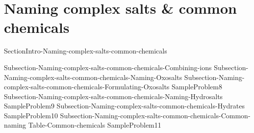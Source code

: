 \documentclass[main.tex]{subfiles}
\newcommand\chapterlabel{Ch-naming}\setcounter{figurenewcounter}{0}\setcounter{tablenewcounter}{0}\setcounter{formulanewcounter}{0}
\begin{document}
\section{Naming complex salts  \& common chemicals}
{SectionIntro-Naming-complex-salts-common-chemicals}
\sloppy \begin{description}
{Subsection-Naming-complex-salts-common-chemicals-Combining-ions}
{Subsection-Naming-complex-salts-common-chemicals-Naming-Oxosalts}
{Subsection-Naming-complex-salts-common-chemicals-Formulating-Oxosalts}
{SampleProblem8}
{Subsection-Naming-complex-salts-common-chemicals-Naming-Hydrosalts}
{SampleProblem9}
{Subsection-Naming-complex-salts-common-chemicals-Hydrates}
{SampleProblem10}
{Subsection-Naming-complex-salts-common-chemicals-Common-naming}
{Table-Common-chemicals}	
 {SampleProblem11}
\end{description}






 \clearpage\thispagestyle{empty}\mbox{}




 
\end{document}
